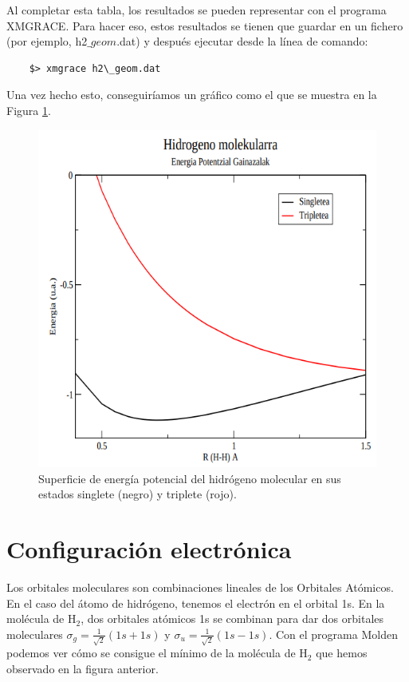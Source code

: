 \documentclass{tufte-book}
\begin{document}
Al completar esta tabla, los resultados se pueden representar con 
el programa XMGRACE. Para hacer eso, estos resultados se tienen 
que guardar en un fichero (por ejemplo, h2$\_{geom}$.dat) y 
después ejecutar desde la línea de comando:
\begin{verbatim}
    $> xmgrace h2\_geom.dat
\end{verbatim}
Una vez hecho esto, conseguiríamos un gráfico como el que se muestra en la Figura \ref{fig:sep}.
\begin{figure}[h!]
\centering
\includegraphics[scale=0.3]{PES_H2.png}
\caption{Superficie de energía potencial del hidrógeno molecular en
sus estados singlete (negro) y triplete (rojo).}
\label{fig:sep}
\end{figure}

\section{Configuración electrónica}
Los orbitales moleculares son combinaciones lineales de los
Orbitales Atómicos. En el caso del átomo de hidrógeno, tenemos el
electrón en el orbital 1s. En la molécula de H$_2$, dos orbitales
atómicos 1s se combinan para dar dos orbitales moleculares
$\sigma_g=\frac{1}{\sqrt{2}}(1s+1s)$ y 
$\sigma_u=\frac{1}{\sqrt{2}}(1s-1s)$. Con el programa Molden
podemos ver cómo se consigue el mínimo de la molécula de H$_2$ 
que  hemos observado en la figura anterior.
\end{document}
